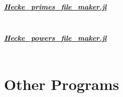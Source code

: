 \subparagraph{\href{https://github.com/pauldubois98/ModularFormsModuloTwo.jl/blob/master/src/data/Hecke_primes_file_maker.jl}{Hecke\_primes\_file\_maker.jl}}
\label{code:HeckePrimesFileMaker}
\inputminted{julia}{Module/HeckePrimesFileMaker.jl}

\subparagraph{\href{https://github.com/pauldubois98/ModularFormsModuloTwo.jl/blob/master/src/data/Hecke_powers_file_maker.jl}{Hecke\_powers\_file\_maker.jl}}
\label{code:HeckePowersFileMaker}
\inputminted{julia}{Module/HeckePowersFileMaker.jl}



\section{Other Programs}